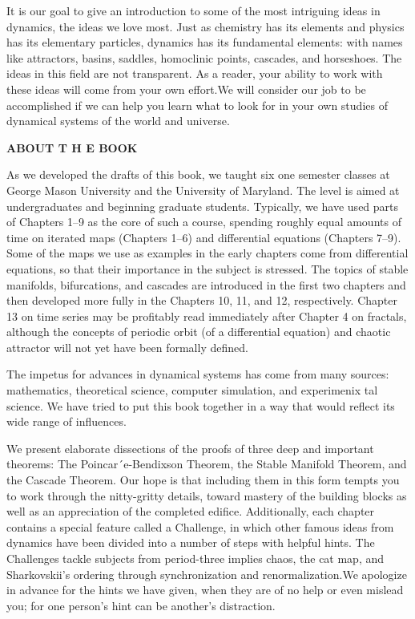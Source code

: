 \documentclass{article}
\begin{document}
It is our goal to give an introduction to some of the most intriguing ideas in
dynamics, the ideas we love most. Just as chemistry has its elements and physics
has its elementary particles, dynamics has its fundamental elements: with names
like attractors, basins, saddles, homoclinic points, cascades, and horseshoes. The
ideas in this field are not transparent. As a reader, your ability to work with these
ideas will come from your own effort.We will consider our job to be accomplished
if we can help you learn what to look for in your own studies of dynamical systems
of the world and universe.

\hfill

\textbf{ABOUT T H E BOOK}

\hfill

As we developed the drafts of this book, we taught six one semester classes at
George Mason University and the University of Maryland. The level is aimed at
undergraduates and beginning graduate students. Typically, we have used parts
of Chapters 1–9 as the core of such a course, spending roughly equal amounts of
time on iterated maps (Chapters 1–6) and differential equations (Chapters 7–9).
Some of the maps we use as examples in the early chapters come from differential
equations, so that their importance in the subject is stressed. The topics of stable
manifolds, bifurcations, and cascades are introduced in the first two chapters and
then developed more fully in the Chapters 10, 11, and 12, respectively. Chapter
13 on time series may be profitably read immediately after Chapter 4 on fractals,
although the concepts of periodic orbit (of a differential equation) and chaotic
attractor will not yet have been formally defined.

The impetus for advances in dynamical systems has come from many
sources: mathematics, theoretical science, computer simulation, and experimenix
tal science. We have tried to put this book together in a way that would reflect
its wide range of influences.

We present elaborate dissections of the proofs of three deep and important
theorems: The Poincar´e-Bendixson Theorem, the Stable Manifold Theorem, and
the Cascade Theorem. Our hope is that including them in this form tempts you
to work through the nitty-gritty details, toward mastery of the building blocks as
well as an appreciation of the completed edifice.
Additionally, each chapter contains a special feature called a Challenge,
in which other famous ideas from dynamics have been divided into a number
of steps with helpful hints. The Challenges tackle subjects from period-three
implies chaos, the cat map, and Sharkovskii’s ordering through synchronization
and renormalization.We apologize in advance for the hints we have given, when
they are of no help or even mislead you; for one person’s hint can be another’s
distraction.
\end{document}
